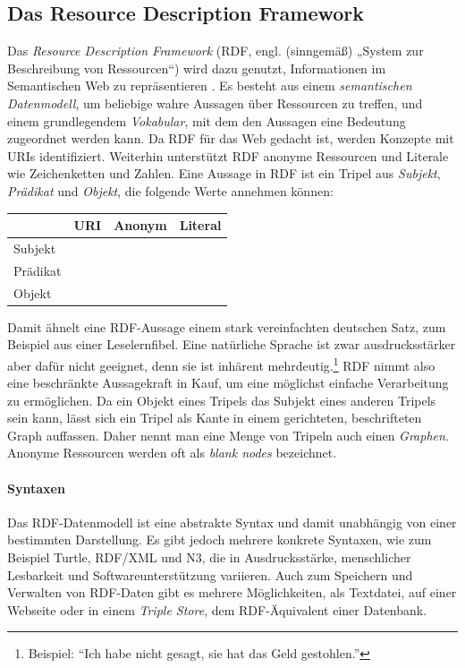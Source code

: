 \subsection{Das Resource Description Framework}
Das \emph{Resource Description Framework} (RDF, engl. (sinngemäß) „System zur Beschreibung von Ressourcen“) wird dazu genutzt, Informationen im Semantischen Web zu repräsentieren \citep{www-rdf}.
Es besteht aus einem \emph{semantischen Datenmodell}, um beliebige wahre Aussagen über Ressourcen zu treffen, und einem
grundlegendem \emph{Vokabular}, mit dem den Aussagen eine Bedeutung zugeordnet werden kann.
Da RDF für das Web gedacht ist, werden Konzepte mit URIs identifiziert.
Weiterhin unterstützt RDF anonyme Ressourcen und Literale wie Zeichenketten und Zahlen.
Eine Aussage in RDF ist ein Tripel aus \emph{Subjekt}, \emph{Prädikat} und \emph{Objekt}, die folgende Werte annehmen können:
\begin{center}
\begin{tabular}{lccc}
\toprule
		&URI		&Anonym			&Literal\\
\midrule
Subjekt		&\checkmark	&\checkmark\\
Prädikat	&\checkmark\\
Objekt    	&\checkmark	&\checkmark      	& \checkmark\\
\bottomrule
\end{tabular} 
\end{center}
Damit ähnelt eine RDF-Aussage einem stark vereinfachten deutschen Satz, zum Beispiel aus einer Leselernfibel.
Eine natürliche Sprache ist zwar ausdrucksstärker aber dafür nicht geeignet, denn sie ist inhärent mehrdeutig.\footnote{Beispiel: "`Ich habe nicht gesagt, sie hat das Geld gestohlen."'}
RDF nimmt also eine beschränkte Aussagekraft in Kauf, um eine möglichst einfache Verarbeitung zu ermöglichen.
Da ein Objekt eines Tripels das Subjekt eines anderen Tripels sein kann, lässt sich ein Tripel als Kante
in einem gerichteten, beschrifteten Graph auffassen.
Daher nennt man eine Menge von Tripeln auch einen \emph{Graphen}. 
Anonyme Ressourcen werden oft als \emph{blank nodes} bezeichnet.
\paragraph{Syntaxen}
Das RDF-Datenmodell ist eine abstrakte Syntax und damit unabhängig von einer bestimmten Darstellung.
Es gibt jedoch mehrere konkrete Syntaxen, wie zum Beispiel Turtle, RDF/XML und N3,  die in Ausdrucksstärke, menschlicher Lesbarkeit und Softwareunterstützung variieren.
Auch zum Speichern und Verwalten von RDF-Daten gibt es mehrere Möglichkeiten, \zb als Textdatei, auf einer Webseite oder in einem \emph{Triple Store}, dem RDF-Äquivalent einer Datenbank.

